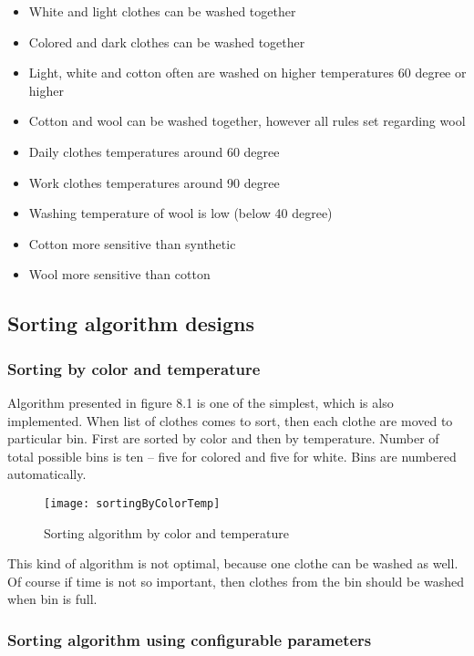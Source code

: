 \begin{itemize}
	\item White and light clothes can be washed together
	\item Colored and dark clothes can be washed together
	\item Light, white and cotton often are washed on higher temperatures 60 degree or higher
	\item Cotton and wool can be washed together, however all rules set regarding wool
	\item Daily clothes temperatures around 60 degree
	\item Work clothes temperatures around 90 degree
	\item Washing temperature of wool is low (below 40 degree)
	\item Cotton more sensitive than synthetic
	\item Wool more sensitive than cotton
\end{itemize}

\subsection{Sorting algorithm designs}

\subsubsection{Sorting by color and temperature}

Algorithm presented in figure 8.1 is one of the simplest, which is also implemented. When list of clothes comes to sort, then each clothe are moved to particular bin. First are sorted by color and then by temperature. Number of total possible bins is ten – five for colored and five for white. Bins are numbered automatically.

\begin{figure}[h]
	\centering
		\texttt{[image: sortingByColorTemp]}
	\caption{Sorting algorithm by color and temperature}
	\label{fig:planning}
\end{figure}

This kind of algorithm is not optimal, because one clothe can be washed as well. Of course if time is not so important, then clothes from the bin should be washed when bin is full.

\subsubsection{Sorting algorithm using configurable parameters}

